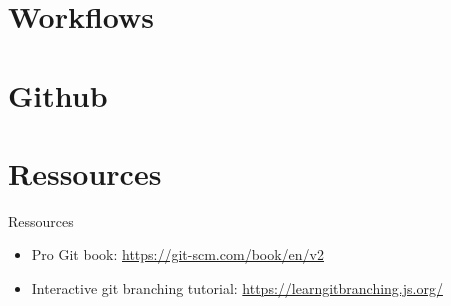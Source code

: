 \documentclass[aspectratio=169]{beamer}
\begin{document}
\section{Workflows}
\section{Github}
\section{Ressources}
\begin{frame}{Ressources}
\begin{itemize}
    \item Pro Git book: \url{https://git-scm.com/book/en/v2}
    \item Interactive git branching tutorial: \url{https://learngitbranching.js.org/}
\end{itemize}
\end{frame}
\end{document}
